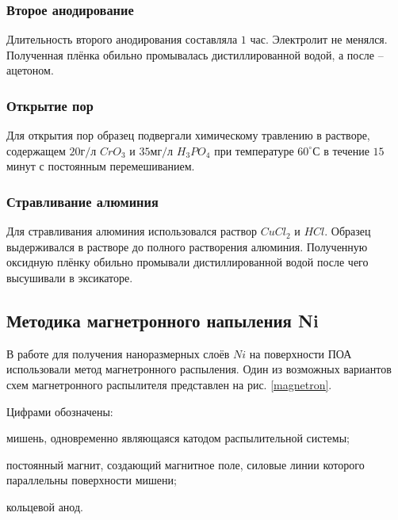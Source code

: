 \subsubsection{Второе анодирование}

Длительность второго анодирования составляла $1$ час. Электролит не менялся. Полученная плёнка обильно промывалась дистиллированной водой, а после – ацетоном.

\subsubsection{Открытие пор}

Для открытия пор образец подвергали химическому травлению в растворе, содержащем $20\text{г/л}$ $CrO_3$ и $35\text{мг/л}$ $H_3PO_4$ при температуре $60^{\circ}С$ в течение $15$ минут с постоянным перемешиванием.

\subsubsection{Стравливание алюминия}

Для стравливания алюминия использовался раствор $CuCl_2$ и $HCl$. Образец выдерживался в растворе до полного растворения алюминия. Полученную оксидную плёнку обильно промывали дистиллированной водой после чего высушивали в эксикаторе.

\subsection{Методика магнетронного напыления Ni}

В работе для получения наноразмерных слоёв $Ni$ на поверхности ПОА использовали метод магнетронного распыления. Один из возможных вариантов схем магнетронного распылителя представлен на рис. \ref{magnetron}.


Цифрами обозначены:

\begin{list1}
\item мишень, одновременно являющаяся катодом распылительной системы;
\item постоянный магнит, создающий магнитное поле, силовые линии которого параллельны поверхности мишени;
\item кольцевой анод.
\end{list1}

